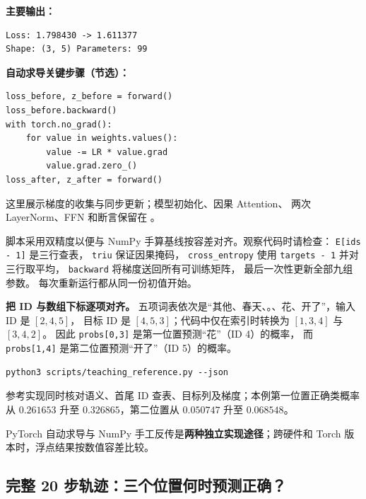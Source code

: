 \textbf{主要输出：}
\begin{verbatim}
Loss: 1.798430 -> 1.611377
Shape: (3, 5) Parameters: 99
\end{verbatim}

\textbf{自动求导关键步骤（节选）：}
\begin{verbatim}
loss_before, z_before = forward()
loss_before.backward()
with torch.no_grad():
    for value in weights.values():
        value -= LR * value.grad
        value.grad.zero_()
loss_after, z_after = forward()
\end{verbatim}
这里展示梯度的收集与同步更新；模型初始化、因果 Attention、
两次 LayerNorm、FFN 和断言保留在
。

脚本采用双精度以便与 NumPy 手算基线按容差对齐。观察代码时请检查：
\texttt{E[ids - 1]} 是三行查表，
\texttt{triu} 保证因果掩码，
\texttt{cross\_entropy} 使用 \texttt{targets - 1} 并对三行取平均，
\texttt{backward} 将梯度送回所有可训练矩阵，
最后一次性更新全部九组参数。
每次重新运行都从同一份初值开始。

\textbf{把 ID 与数组下标逐项对齐。}
五项词表依次是“其他、春天、。、花、开了”，输入 ID 是 $[2,4,5]$，
目标 ID 是 $[4,5,3]$；代码中仅在索引时转换为 $[1,3,4]$ 与 $[3,4,2]$。
因此 \texttt{probs[0,3]} 是第一位置预测“花”（ID 4）的概率，
而 \texttt{probs[1,4]} 是第二位置预测“开了”（ID 5）的概率。
\begin{verbatim}
python3 scripts/teaching_reference.py --json
\end{verbatim}
参考实现同时核对语义、首尾 ID 查表、目标列及梯度；本例第一位置正确类概率
从 $0.261653$ 升至 $0.326865$，第二位置从 $0.050747$ 升至 $0.068548$。

PyTorch 自动求导与 NumPy 手工反传是\textbf{两种独立实现途径}；跨硬件和 Torch 版本时，浮点结果按数值容差比较。


\subsection{完整 20 步轨迹：三个位置何时预测正确？}

